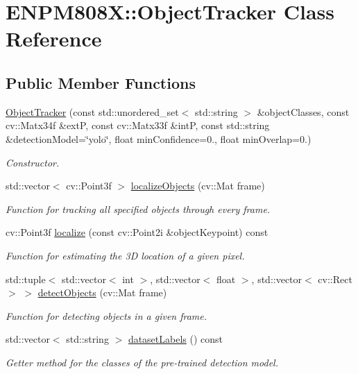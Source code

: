 \hypertarget{class_e_n_p_m808_x_1_1_object_tracker}{}\section{E\+N\+P\+M808X\+:\+:Object\+Tracker Class Reference}
\label{class_e_n_p_m808_x_1_1_object_tracker}
\subsection*{Public Member Functions}
\begin{DoxyCompactItemize}
\item 
\hyperlink{class_e_n_p_m808_x_1_1_object_tracker_a457dcaca4e26ff55678ac2f2d727f322}{Object\+Tracker} (const std\+::unordered\+\_\+set$<$ std\+::string $>$ \&object\+Classes, const cv\+::\+Matx34f \&extP, const cv\+::\+Matx33f \&intP, const std\+::string \&detection\+Model=\char`\"{}yolo\char`\"{}, float min\+Confidence=0., float min\+Overlap=0.)
\begin{DoxyCompactList}\small\item\em Constructor. \end{DoxyCompactList}\item 
std\+::vector$<$ cv\+::\+Point3f $>$ \hyperlink{class_e_n_p_m808_x_1_1_object_tracker_aaabe274d63cce01922a9c1a834a52039}{localize\+Objects} (cv\+::\+Mat frame)
\begin{DoxyCompactList}\small\item\em Function for tracking all specified objects through every frame. \end{DoxyCompactList}\item 
cv\+::\+Point3f \hyperlink{class_e_n_p_m808_x_1_1_object_tracker_a488d16d7015a48a0fbdd0cf4b766bb54}{localize} (const cv\+::\+Point2i \&object\+Keypoint) const
\begin{DoxyCompactList}\small\item\em Function for estimating the 3D location of a given pixel. \end{DoxyCompactList}\item 
std\+::tuple$<$ std\+::vector$<$ int $>$, std\+::vector$<$ float $>$, std\+::vector$<$ cv\+::\+Rect $>$ $>$ \hyperlink{class_e_n_p_m808_x_1_1_object_tracker_a109217a8fae2ca7ec36eb8e437e82b45}{detect\+Objects} (cv\+::\+Mat frame)
\begin{DoxyCompactList}\small\item\em Function for detecting objects in a given frame. \end{DoxyCompactList}\item 
std\+::vector$<$ std\+::string $>$ \hyperlink{class_e_n_p_m808_x_1_1_object_tracker_abec22b27cb028cf5911b4198970f3c57}{dataset\+Labels} () const
\begin{DoxyCompactList}\small\item\em Getter method for the classes of the pre-\/trained detection model. \end{DoxyCompactList}\end{DoxyCompactItemize}


